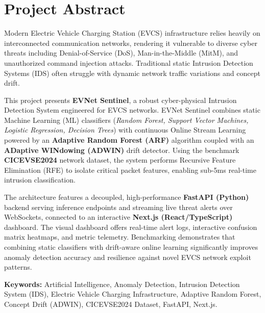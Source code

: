 \documentclass[12pt, a4paper]{article}
\begin{document}
\section*{\centering \Huge \textcolor{primary}{Project Abstract}}

\vspace{1em}

\noindent
Modern Electric Vehicle Charging Station (EVCS) infrastructure relies heavily on interconnected communication networks, rendering it vulnerable to diverse cyber threats including Denial-of-Service (DoS), Man-in-the-Middle (MitM), and unauthorized command injection attacks. Traditional static Intrusion Detection Systems (IDS) often struggle with dynamic network traffic variations and concept drift. 

\vspace{1em}

\noindent
This project presents \textbf{EVNet Sentinel}, a robust cyber-physical Intrusion Detection System engineered for EVCS networks. EVNet Sentinel combines static Machine Learning (ML) classifiers (\textit{Random Forest, Support Vector Machines, Logistic Regression, Decision Trees}) with continuous Online Stream Learning powered by an \textbf{Adaptive Random Forest (ARF)} algorithm coupled with an \textbf{ADaptive WINdowing (ADWIN)} drift detector. Using the benchmark \textbf{CICEVSE2024} network dataset, the system performs Recursive Feature Elimination (RFE) to isolate critical packet features, enabling sub-5ms real-time intrusion classification. 

\vspace{1em}

\noindent
The architecture features a decoupled, high-performance \textbf{FastAPI (Python)} backend serving inference endpoints and streaming live threat alerts over WebSockets, connected to an interactive \textbf{Next.js (React/TypeScript)} dashboard. The visual dashboard offers real-time alert logs, interactive confusion matrix heatmaps, and metric telemetry. Benchmarking demonstrates that combining static classifiers with drift-aware online learning significantly improves anomaly detection accuracy and resilience against novel EVCS network exploit patterns.

\vspace{2.5em}

\noindent
\begin{tcolorbox}[colback=primary!5, colframe=secondary, arc=4pt, boxrule=0.8pt]
\textbf{\textcolor{primary}{Keywords:}} Artificial Intelligence, Anomaly Detection, Intrusion Detection System (IDS), Electric Vehicle Charging Infrastructure, Adaptive Random Forest, Concept Drift (ADWIN), CICEVSE2024 Dataset, FastAPI, Next.js.
\end{tcolorbox}
\end{document}
